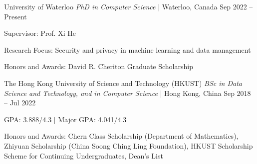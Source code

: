 
\begin{cventries2}

  \cventrynew
    {University of Waterloo \textnormal{\textit{PhD in Computer Science} | Waterloo, Canada}} %
    {Sep 2022 – Present} %
    {
      \begin{cvitems} %
        \item {Supervisor: Prof. Xi He}
        \item {Research Focus: Security and privacy in machine learning and data management}
        \item {Honors and Awards: David R. Cheriton Graduate Scholarship}
      \end{cvitems}
    }

  \cventrynew
    {The Hong Kong University of Science and Technology (HKUST) \textnormal{\textit{BSc in Data Science and Technology, and in Computer Science} | Hong Kong, China}} %
    {Sep 2018 – Jul 2022} %
    {
      \begin{cvitems} %
        \item {GPA: 3.888/4.3 | Major GPA: 4.041/4.3}
        \item {Honors and Awards: Chern Class Scholarship (Department of Mathematics), Zhiyuan Scholarship (China Soong Ching Ling Foundation), HKUST Scholarship Scheme for Continuing Undergraduates, Dean's List}
      \end{cvitems}
    }


\end{cventries2}
